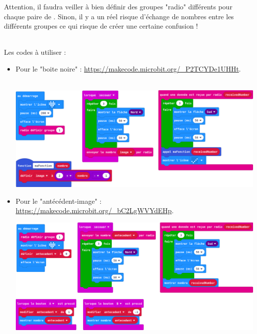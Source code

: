 \begin{remarque}
    Attention, il faudra veiller à bien définir des groupes "radio" différents pour chaque paire de \mb.
    Sinon, il y a un réel risque d'échange de nombres entre les différents groupes ce qui risque de créer une certaine confusion !\\~

    Les codes à utiliser :
    \begin{itemize}
        \item Pour le \mb "boite noire" : \url{https://makecode.microbit.org/_P2TCYDe1UHHt}.\\~
        
        \includegraphics[width=0.8\linewidth]{res/mb-fonction-boite-noire.png}

        \item Pour le \mb "antécédent-image" : \url{https://makecode.microbit.org/_bC2LgWVYdEHp}.
        
        \includegraphics[width=0.8\linewidth]{res/mb-fonction-ant-img.png}
    \end{itemize}
   
\end{remarque}
